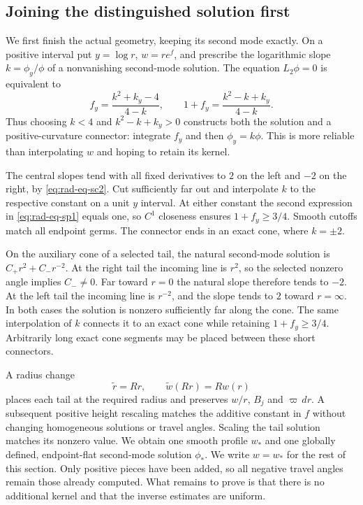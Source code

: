 \subsection{Joining the distinguished solution first}
\label{subsec:rad-cone-bump-target-match}

We first finish the actual geometry, keeping its second mode exactly.
On a positive interval put $y=\log r$, $w=re^f$, and prescribe the
logarithmic slope $k=\phi_y/\phi$ of a nonvanishing second-mode solution.
The equation $L_2\phi=0$ is equivalent to
\begin{equation}\label{eq:rad-eq-sp1}
 f_y=\frac{k^2+k_y-4}{4-k},\qquad
 1+f_y=\frac{k^2-k+k_y}{4-k}.
\end{equation}
Thus choosing $k<4$ and $k^2-k+k_y>0$ constructs both the solution and
a positive-curvature connector: integrate $f_y$ and then
$\phi_y=k\phi$.  This is more reliable than interpolating $w$ and
hoping to retain its kernel.

The central slopes tend with all fixed derivatives to $2$ on the left
and $-2$ on the right, by \eqref{eq:rad-eq-sc2}.  Cut sufficiently far
out and interpolate $k$ to the respective constant on a unit $y$
interval.  At either constant the second expression in
\eqref{eq:rad-eq-sp1} equals one, so $C^1$ closeness ensures
$1+f_y\ge3/4$.  Smooth cutoffs match all endpoint germs.
The connector ends in an exact cone, where $k=\pm2$.

On the auxiliary cone of a selected tail, the natural second-mode
solution is $C_+r^2+C_-r^{-2}$.  At the right tail the incoming line
is $r^2$, so the selected nonzero angle implies $C_-\ne0$.
Far toward $r=0$ the natural slope therefore tends to $-2$.
At the left tail the incoming line is $r^{-2}$, and the slope tends
to $2$ toward $r=\infty$.  In both cases the solution is nonzero
sufficiently far along the cone.  The same interpolation of $k$
connects it to an exact cone while retaining $1+f_y\ge3/4$.
Arbitrarily long exact cone segments may be placed between these short
connectors.

A radius change
\begin{equation}\label{eq:rad-eq-ha1}
 \widetilde r=Rr,\qquad \widetilde w(Rr)=Rw(r)
\end{equation}
places each tail at the required radius and preserves $w/r$, $B_j$ and
$\varpi\,dr$.  A subsequent positive height rescaling matches the
additive constant in $f$ without changing homogeneous solutions or
travel angles.  Scaling the tail solution matches its nonzero value.
We obtain one smooth profile $w_*$ and one globally defined, endpoint-flat
second-mode solution $\phi_*$.  We write $w=w_*$ for the rest of this
section.  Only positive pieces have been added, so all
negative travel angles remain those already computed.
What remains to prove is that there is no additional kernel and that
the inverse estimates are uniform.

